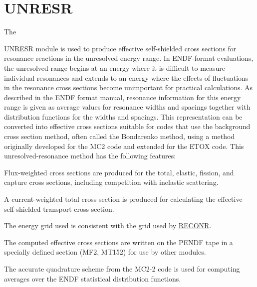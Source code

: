 \section{UNRESR}
\label{sUNRESR}

\hypertarget{sUNRESRhy}{The}
UNRESR module is used to produce effective self-shielded
 cross sections for resonance reactions in the
unresolved energy range. In ENDF-format
evaluations, the unresolved range begins at an energy where it is difficult
to measure individual resonances and extends to an energy where the effects
of fluctuations in the resonance cross sections become unimportant for
practical calculations.  As described in the ENDF format
manual,\cite{ENDF102} resonance information for this energy range is
given as average values for resonance widths and spacings together
with distribution functions for the widths and spacings.  This
representation can be converted into effective cross sections suitable
for codes that use the background cross section method, often
called the Bondarenko method,\cite{Bondarenko}
using a method originally developed for the MC2
code\cite{MC2} and extended for the ETOX
code\cite{ETOX}.  This unresolved-resonance method
has the following features:

\begin{itemize}
\begin{singlespace}
\item Flux-weighted cross sections are produced for the total,
    elastic, fission, and capture cross sections, including
    competition with inelastic scattering.

\item A current-weighted total cross section is produced for
    calculating the effective self-shielded transport cross section.

\item The energy grid used is consistent with the grid used by
   \hyperlink{sRECONRhy}{RECONR}.

\item The computed effective cross sections are written on the
   PENDF tape in a specially defined section (MF2, MT152) for
   use by other modules.

\item The accurate quadrature scheme from the MC2-2 code\cite{MC22}
   is used for computing averages over the ENDF statistical distribution
   functions.
\end{singlespace}
\end{itemize}

